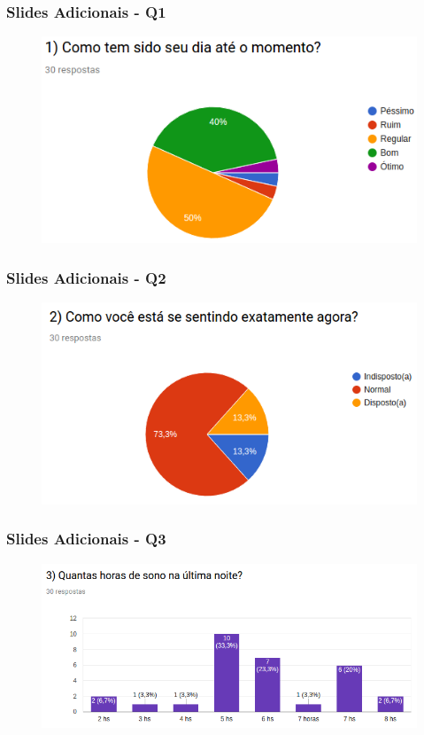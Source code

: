 \begin{frame}
\frametitle{Slides Adicionais - Q1}
\begin{figure}
\centering
\includegraphics[scale=0.55]{figuras/q1.png}
\end{figure}
\end{frame}

\begin{frame}
\frametitle{Slides Adicionais - Q2}
\begin{figure}
\centering
\includegraphics[scale=0.5]{figuras/q2.png}
\end{figure}
\end{frame}

\begin{frame}
\frametitle{Slides Adicionais - Q3}
\begin{figure}
\centering
\includegraphics[scale=0.40]{figuras/q3.png}
\end{figure}
\end{frame}

